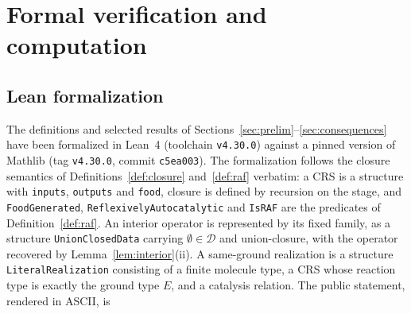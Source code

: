 \documentclass[11pt,a4paper]{article}
\theoremstyle{plain}
\theoremstyle{definition}
\theoremstyle{remark}
\newcommand{\cD}{\mathcal{D}}
\newcommand{\lean}[1]{\texttt{#1}}
\begin{document}
\section{Formal verification and computation}\label{sec:verification}

\subsection{Lean formalization}

The definitions and selected results of Sections~\ref{sec:prelim}--\ref{sec:consequences} have been formalized in Lean~4 (toolchain \lean{v4.30.0}) against a pinned version of Mathlib (tag \lean{v4.30.0}, commit \lean{c5ea003}). The formalization follows the closure semantics of Definitions~\ref{def:closure} and~\ref{def:raf} verbatim: a CRS is a structure with \lean{inputs}, \lean{outputs} and \lean{food}, closure is defined by recursion on the stage, and \lean{FoodGenerated}, \lean{ReflexivelyAutocatalytic} and \lean{IsRAF} are the predicates of Definition~\ref{def:raf}. An interior operator is represented by its fixed family, as a structure \lean{UnionClosedData} carrying $\emptyset\in\cD$ and union-closure, with the operator recovered by Lemma~\ref{lem:interior}(ii). A same-ground realization is a structure \lean{LiteralRealization} consisting of a finite molecule type, a CRS whose reaction type is exactly the ground type $E$, and a catalysis relation. The public statement, rendered in ASCII, is
\end{document}
